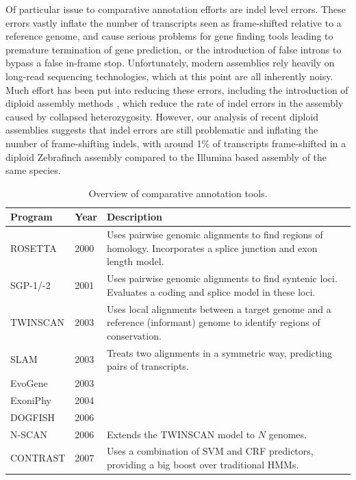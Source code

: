 \documentclass[fleqn,10pt]{wlscirep}
\begin{document}
Of particular issue to comparative annotation efforts are indel level errors. These errors vastly inflate the number of transcripts seen as frame-shifted relative to a reference genome, and cause serious problems for gene finding tools leading to premature termination of gene prediction, or the introduction of false introns to bypass a false in-frame stop. Unfortunately, modern assemblies rely heavily on long-read sequencing technologies, which at this point are all inherently noisy. Much effort has been put into reducing these errors, including the introduction of diploid assembly methods \cite{chin2016phased}, which reduce the rate of indel errors in the assembly caused by collapsed heterozygosity. However, our analysis of recent diploid assemblies suggests that indel errors are still problematic and inflating the number of frame-shifting indels, with around 1\% of transcripts frame-shifted in a diploid Zebrafinch assembly compared to the Illumina based assembly of the same species.



\begin{table}[ht]
\centering
\begin{tabular}{|l|l|p{12cm}|}
\hline
Program & Year & Description \\
\hline
ROSETTA & 2000 \cite{batzoglou2000human} & Uses pairwise genomic alignments to find regions of homology. Incorporates a splice junction and exon length model. \\
\hline
SGP-1/-2 & 2001 \cite{wiehe2001sgp} & Uses pairwise genomic alignments to find syntenic loci. Evaluates a coding and splice model in these loci.  \\
\hline
TWINSCAN & 2003 \cite{flicek2003leveraging} & Uses local alignments between a target genome and a reference (informant) genome to identify regions of conservation. \\
\hline
SLAM & 2003 \cite{alexandersson2003slam} & Treats two alignments in a symmetric way, predicting pairs of transcripts. \\
\hline
EvoGene & 2003 \cite{pedersen2003gene} & \\
\hline
ExoniPhy & 2004 \cite{siepel2004computational} & \\
\hline
DOGFISH & 2006 \cite{carter2006vertebrate} & \\
\hline
N-SCAN & 2006 \cite{gross2006using} & Extends the TWINSCAN model to $N$ genomes. \\
\hline
CONTRAST & 2007 \cite{gross2007contrast} & Uses a combination of SVM and CRF predictors, providing a big boost over traditional HMMs. \\
\hline
\end{tabular}
\caption{\label{tab:history}Overview of comparative annotation tools.}
\end{table}
\end{document}

